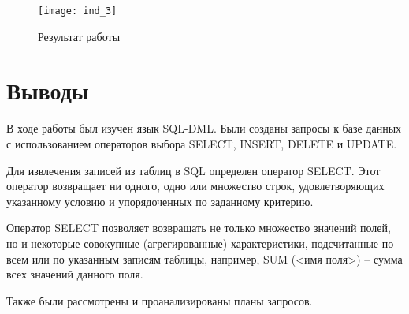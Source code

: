 \begin{figure}[H]
	\begin{center}
		\texttt{[image: ind\_3]}
		\caption{Результат работы} 
		\label{pic:ind_3} %
	\end{center}
\end{figure}

\section{Выводы}
В ходе работы был изучен язык SQL-DML. Были созданы запросы к базе данных с
использованием операторов выбора SELECT, INSERT, DELETE и UPDATE.

Для извлечения записей из таблиц в SQL определен оператор SELECT. Этот оператор
возвращает ни одного, одно или множество строк, удовлетворяющих указанному условию и упорядоченных по заданному критерию. 

Оператор SELECT позволяет возвращать
не только множество значений полей, но и некоторые совокупные (агрегированные) характеристики, подсчитанные по всем или по указанным записям таблицы, например, SUM
(<имя поля>) – сумма всех значений данного поля. 

Также были рассмотрены и проанализированы планы запросов.

